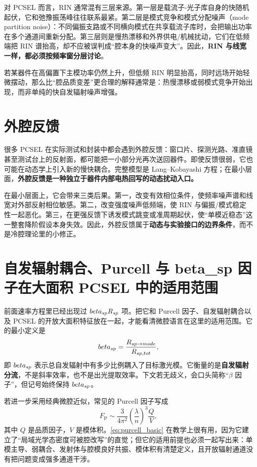 对 PCSEL 而言，RIN 通常混有三层来源。第一层是载流子-光子库自身的快随机起伏，它和弛豫振荡峰往往联系最紧。第二层是模式竞争和模式分配噪声（mode partition noise）：不同偏振支路或不同横向模式在共享载流子库时，会把输出功率在多个通道间重新分配。第三层则是慢热漂移和外界供电/机械扰动，它们在低频端把 RIN 谱抬高，却不应被误判成“腔本身的快噪声变大”。因此，\textbf{RIN 与线宽一样，都必须按频率窗分层讨论}。

若某器件在高偏置下主模功率仍然上升，但低频 RIN 明显抬高，同时远场开始轻微摆动，那么比“腔品质变差”更合理的解释通常是：热慢漂移或弱模式竞争开始出现，而非单纯的快自发辐射噪声增强。

\section{外腔反馈}
很多 PCSEL 在实际测试和封装中都会遇到外腔反馈：窗口片、探测光路、准直镜甚至测试台上的反射面，都可能把一小部分光再次送回器件。即使反馈很弱，它也可能在动态学上引入新的慢快耦合。完整模型是 Lang--Kobayashi 方程；在最小层面，\textbf{外腔反馈是一种独立于器件内部电热回写的动态扰动入口。}

在最小层面上，它会带来三类后果。第一，改变有效相位条件，使频率噪声谱和线宽对外部反射相位敏感。第二，改变强度噪声低频端，使 RIN 与偏振/模式稳定性一起恶化。第三，在更强反馈下诱发模式跳变或准周期起伏，使“单模近稳态”这一整套降阶假设本身失效。因此，外腔反馈属于\textbf{动态与实验接口的边界条件}，而不是冷腔理论里的小修正。

\section{自发辐射耦合、Purcell 与 beta\_sp 因子在大面积 PCSEL 中的适用范围}
前面速率方程里已经出现过 $beta_{sp} R_{sp}$ 项。把它和 Purcell 因子、自发辐射耦合以及 PCSEL 的开放大面积特征放在一起，才能看清微腔语言在这里的适用范围。它的最小定义是
\begin{equation}
beta_{sp}
=
\frac{R_{sp\rightarrow mode}}{R_{sp,tot}},
\label{eq:beta_def}
\end{equation}
即 $beta_{sp}$ 表示总自发辐射中有多少比例耦入了目标激光模。它衡量的是\textbf{自发辐射分流}，不是斜率效率，也不是出光提取效率。下文若无歧义，会口头简称“$\beta$ 因子”，但记号始终保持 $beta_{sp}$。

若进一步采用经典微腔近似，常见的 Purcell 因子写成
\begin{equation}
F_{\mathrm{P}}
\sim
\frac{3}{4\pi^2}
\left(\frac{\lambda}{n}\right)^3
\frac{Q}{V},
\label{eq:purcell_basic}
\end{equation}
其中 $Q$ 是品质因子，$V$ 是模体积。\cref{eq:purcell_basic} 在教学上很有用，因为它建立了“局域光学态密度可被腔改写”的直觉；但它的适用前提也必须一起写出来：单模主导、弱耦合、发射体与腔模良好共振、模体积有清楚定义，且开放辐射通道没有把问题变成强多通道干涉。

